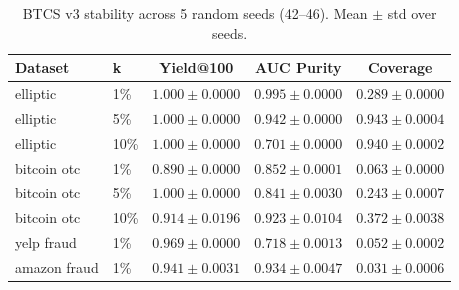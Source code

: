 \begin{table}[t]
\centering
\caption{BTCS v3 stability across 5 random seeds (42–46). Mean $\pm$ std over seeds.}
\label{tab:seeds}
\begin{tabular}{llccc}
\toprule
\textbf{Dataset} & \textbf{k} & \textbf{Yield@100} & \textbf{AUC Purity} & \textbf{Coverage} \\
\midrule
elliptic & 1\% & $1.000 \pm 0.0000$ & $0.995 \pm 0.0000$ & $0.289 \pm 0.0000$ \\
elliptic & 5\% & $1.000 \pm 0.0000$ & $0.942 \pm 0.0000$ & $0.943 \pm 0.0004$ \\
elliptic & 10\% & $1.000 \pm 0.0000$ & $0.701 \pm 0.0000$ & $0.940 \pm 0.0002$ \\
bitcoin otc & 1\% & $0.890 \pm 0.0000$ & $0.852 \pm 0.0001$ & $0.063 \pm 0.0000$ \\
bitcoin otc & 5\% & $1.000 \pm 0.0000$ & $0.841 \pm 0.0030$ & $0.243 \pm 0.0007$ \\
bitcoin otc & 10\% & $0.914 \pm 0.0196$ & $0.923 \pm 0.0104$ & $0.372 \pm 0.0038$ \\
yelp fraud & 1\% & $0.969 \pm 0.0000$ & $0.718 \pm 0.0013$ & $0.052 \pm 0.0002$ \\
amazon fraud & 1\% & $0.941 \pm 0.0031$ & $0.934 \pm 0.0047$ & $0.031 \pm 0.0006$ \\
\bottomrule
\end{tabular}
\end{table}
